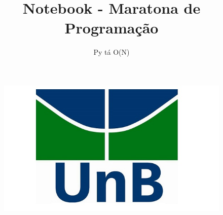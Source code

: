 \documentclass{article}
\title{Notebook - Maratona de Programação}
\author{Py tá O(N)}
\date{}
\begin{document}
\begin{figure}[t]
\includegraphics[scale=0.4]{unb.jpg}
\centering
\end{figure}
\maketitle
\end{document}
